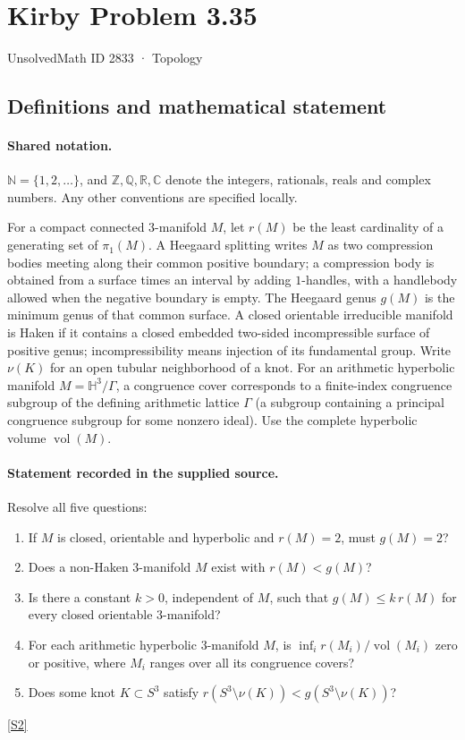 \documentclass[11pt]{article}
\newcommand{\sref}[2]{\hyperlink{source:#1:#2}{[S#2]}}
\begin{document}
\setcounter{section}{2832}
\section{Kirby Problem 3.35}\label{2833}
{\small\sffamily UnsolvedMath ID 2833 · Topology}
\subsection{Definitions and mathematical statement}

\paragraph{Shared notation.}$\mathbb N=\{1,2,\ldots\}$, and $\mathbb Z,\mathbb Q,\mathbb R,\mathbb C$ denote the integers, rationals, reals and complex numbers. Any other conventions are specified locally.


For a compact connected $3$-manifold $M$, let $r(M)$ be the least cardinality of a generating set of $\pi_1(M)$. A Heegaard splitting writes $M$ as two compression bodies meeting along their common positive boundary; a compression body is obtained from a surface times an interval by adding $1$-handles, with a handlebody allowed when the negative boundary is empty. The Heegaard genus $g(M)$ is the minimum genus of that common surface. A closed orientable irreducible manifold is Haken if it contains a closed embedded two-sided incompressible surface of positive genus; incompressibility means injection of its fundamental group. Write $\nu(K)$ for an open tubular neighborhood of a knot.
For an arithmetic hyperbolic manifold $M=\mathbb H^3/\Gamma$, a congruence cover corresponds to a finite-index congruence subgroup of the defining arithmetic lattice $\Gamma$ (a subgroup containing a principal congruence subgroup for some nonzero ideal). Use the complete hyperbolic volume $\operatorname{vol}(M)$.
\paragraph{Statement recorded in the supplied source.}
Resolve all five questions:
\begin{enumerate}
\item If $M$ is closed, orientable and hyperbolic and $r(M)=2$, must $g(M)=2$?
\item Does a non-Haken $3$-manifold $M$ exist with $r(M)<g(M)$?
\item Is there a constant $k>0$, independent of $M$, such that $g(M)\le k\,r(M)$ for every closed orientable $3$-manifold?
\item For each arithmetic hyperbolic $3$-manifold $M$, is $\inf_i r(M_i)/\operatorname{vol}(M_i)$ zero or positive, where $M_i$ ranges over all its congruence covers?
\item Does some knot $K\subset S^3$ satisfy $r(S^3\setminus\nu(K))<g(S^3\setminus\nu(K))$?
\end{enumerate}
\sref{2833}{2}
\end{document}

